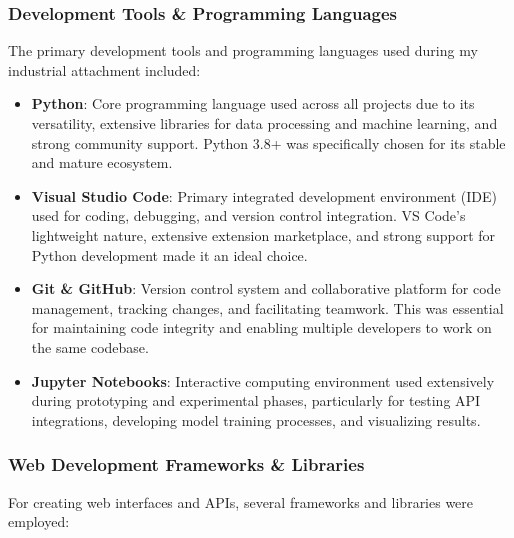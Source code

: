 \documentclass[12pt,a4paper]{article}
\begin{document}
\subsubsection{Development Tools \& Programming Languages}
The primary development tools and programming languages used during my industrial attachment included:

\begin{itemize}
    \item \textbf{Python}: Core programming language used across all projects due to its versatility, extensive libraries for data processing and machine learning, and strong community support. Python 3.8+ was specifically chosen for its stable and mature ecosystem.
    
    \item \textbf{Visual Studio Code}: Primary integrated development environment (IDE) used for coding, debugging, and version control integration. VS Code's lightweight nature, extensive extension marketplace, and strong support for Python development made it an ideal choice.
    
    \item \textbf{Git \& GitHub}: Version control system and collaborative platform for code management, tracking changes, and facilitating teamwork. This was essential for maintaining code integrity and enabling multiple developers to work on the same codebase.
    
    \item \textbf{Jupyter Notebooks}: Interactive computing environment used extensively during prototyping and experimental phases, particularly for testing API integrations, developing model training processes, and visualizing results.
\end{itemize}

\subsubsection{Web Development Frameworks \& Libraries}
For creating web interfaces and APIs, several frameworks and libraries were employed:
\end{document}
